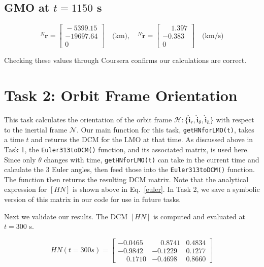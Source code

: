 \documentclass[conf]{new-aiaa}
\begin{document}
\subsection*{GMO at $t = 1150$ s}
\[
{}^N{\bm{r}} = 
\begin{bmatrix}
\phantom{}-5399.15 \\ -19697.64 \\ 0
\end{bmatrix} \quad \text{(km)}, \quad
{}^N\dot{\bm{r}} = 
\begin{bmatrix}
\phantom{-}1.397 \\ -0.383 \\ 0
\end{bmatrix} \quad \text{(km/s)}
\]

Checking these values through Coursera confirms our calculations are correct.
















\section{Task 2: Orbit Frame Orientation}
This task calculates the orientation of the orbit frame $\mathcal{H} : \{\hat{\bm{i}}_r, \hat{\bm{i}}_{\theta}, \hat{\bm{i}}_h\}$ with respect to the inertial frame \(\mathcal{N}\). Our main function for this task, \texttt{getHNforLMO(t)}, takes a time $t$ and returns the DCM for the LMO at that time. As discussed above in Task 1, the \texttt{Euler313toDCM()} function, and its associated matrix, is used here. Since only $\theta$ changes with time, \texttt{getHNforLMO(t)} can take in the current time and calculate the 3 Euler angles, then feed those into the \texttt{Euler313toDCM()} function. The function then returns the resulting DCM matrix. Note that the analytical expression for $[HN]$ is shown above in Eq.~\eqref{euler}. In Task 2, we save a symbolic version of this matrix in our code for use in future tasks. 

Next we validate our results. The DCM $[HN]$ is computed and evaluated at $t = 300$ s.

\[
HN(t = 300s) = 
\begin{bmatrix}
-0.0465 & \phantom{-}0.8741 & 0.4834 \\
-0.9842 & -0.1229 & 0.1277 \\
\phantom{-}0.1710 & -0.4698 & 0.8660
\end{bmatrix}
\]
\end{document}
